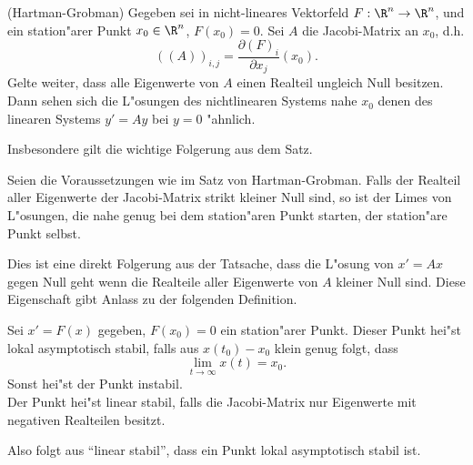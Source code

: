 \begin{satz} \label{hartGrob}(Hartman-Grobman) Gegeben sei in nicht-lineares Vektorfeld 
$F:\R^n\rightarrow \R^n$, und ein station"arer Punkt $x_0\in\R^n$, $F(x_0)=0$. 
Sei $A$ die Jacobi-Matrix an $x_0$, d.h.
$$ ((A))_{i,j} = \frac{\partial (F)_i}{\partial x_j}(x_0).$$
Gelte weiter, dass alle Eigenwerte von $A$ einen Realteil ungleich Null besitzen. 
Dann sehen sich die L"osungen des nichtlinearen Systems nahe $x_0$ 
denen des linearen Systems $y'=Ay$ bei $y=0$ "ahnlich.
\end{satz}

Insbesondere gilt die wichtige Folgerung aus dem Satz.
\begin{satz} Seien die Voraussetzungen wie im Satz von Hartman-Grobman. 
Falls der Realteil aller Eigenwerte der Jacobi-Matrix strikt kleiner Null
sind, so ist der Limes von L"osungen, die nahe genug bei dem station"aren Punkt 
starten, der station"are Punkt selbst.
\end{satz}
Dies ist eine direkt Folgerung aus der Tatsache, dass die L"osung von $x'=Ax$
gegen Null geht wenn die Realteile aller Eigenwerte von $A$ kleiner Null sind. 
Diese Eigenschaft gibt Anlass zu der folgenden Definition.

\begin{sdefi} Sei $x'=F(x)$ gegeben, $F(x_0)=0$ ein station"arer Punkt. Dieser
Punkt hei"st lokal asymptotisch stabil, falls aus $x(t_0)-x_0$ klein genug folgt,
dass
$$ \lim_{t\rightarrow\infty} x(t) = x_0.$$
Sonst hei"st der Punkt instabil.\\
Der Punkt hei"st linear stabil, falls die Jacobi-Matrix nur Eigenwerte mit 
negativen Realteilen besitzt.  
\end{sdefi}
Also folgt aus ``linear stabil'', dass ein Punkt lokal asymptotisch stabil ist. 

